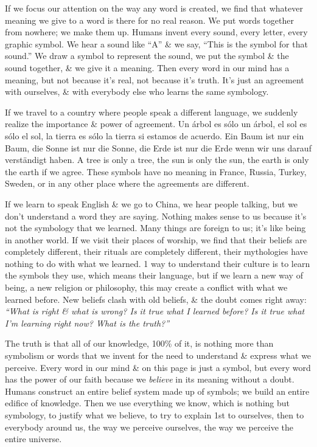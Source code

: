 \documentclass{article}
\numberwithin{equation}{section}
\begin{document}
If we focus our attention on the way any word is created, we find that whatever meaning we give to a word is there for no real reason. We put words together from nowhere; we make them up. Humans invent every sound, every letter, every graphic symbol. We hear a sound like ``A'' \& we say, ``This is the symbol for that sound.'' We draw a symbol to represent the sound, we put the symbol \& the sound together, \& we give it a meaning. Then every word in our mind has a meaning, but not because it's real, not because it's truth. It's just an agreement with ourselves, \& with everybody else who learns the same symbology.

If we travel to a country where people speak a different language, we suddenly realize the importance \& power of agreement. Un árbol es sólo un árbol, el sol es sólo el sol, la tierra es sólo la tierra si estamos de acuerdo. Ein Baum ist nur ein Baum, die Sonne ist nur die Sonne, die Erde ist nur die Erde wenn wir uns darauf verständigt haben. A tree is only a tree, the sun is only the sun, the earth is only the earth if we agree. These symbols have no meaning in France, Russia, Turkey, Sweden, or in any other place where the agreements are different.

If we learn to speak English \& we go to China, we hear people talking, but we don't understand a word they are saying. Nothing makes sense to us because it's not the symbology that we learned. Many things are foreign to us; it's like being in another world. If we visit their places of worship, we find that their beliefs are completely different, their rituals are completely different, their mythologies have nothing to do with what we learned. 1 way to understand their culture is to learn the symbols they use, which means their language, but if we learn a new way of being, a new religion or philosophy, this may create a conflict with what we learned before. New beliefs clash with old beliefs, \& the doubt comes right away: \textit{``What is right \& what is wrong? Is it true what I learned before? Is it true what I'm learning right now? What is the truth?''}

The truth is that all of our knowledge, 100\% of it, is nothing more than symbolism or words that we invent for the need to understand \& express what we perceive. Every word in our mind \& on this page is just a symbol, but every word has the power of our faith because we \textit{believe} in its meaning without a doubt. Humans construct an entire belief system made up of symbols; we build an entire edifice of knowledge. Then we use everything we know, which is nothing but symbology, to justify what we believe, to try to explain 1st to ourselves, then to everybody around us, the way we perceive ourselves, the way we perceive the entire universe.
\end{document}
